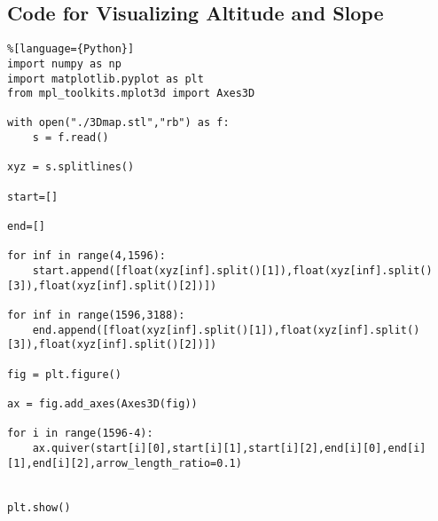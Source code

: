 \documentclass[./main.tex]{subfiles}
\begin{document}
    \subsection{Code for Visualizing Altitude and Slope}
    \begin{spacing}
        \begin{lstlisting}%[language={Python}]
import numpy as np
import matplotlib.pyplot as plt
from mpl_toolkits.mplot3d import Axes3D

with open("./3Dmap.stl","rb") as f:
    s = f.read()

xyz = s.splitlines()

start=[]

end=[]

for inf in range(4,1596):
    start.append([float(xyz[inf].split()[1]),float(xyz[inf].split()[3]),float(xyz[inf].split()[2])])

for inf in range(1596,3188):
    end.append([float(xyz[inf].split()[1]),float(xyz[inf].split()[3]),float(xyz[inf].split()[2])])

fig = plt.figure()

ax = fig.add_axes(Axes3D(fig))

for i in range(1596-4):
    ax.quiver(start[i][0],start[i][1],start[i][2],end[i][0],end[i][1],end[i][2],arrow_length_ratio=0.1)


plt.show()
        \end{lstlisting}
    \end{spacing}
\end{document}
